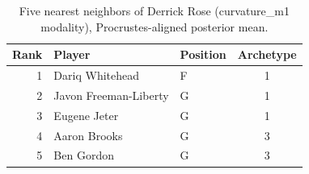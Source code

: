 \begin{table}[htbp]
  \centering\small
  \begin{tabular}{rllc}
    \toprule
    Rank & Player & Position & Archetype \\
    \midrule
    1 & Dariq Whitehead & F & 1 \\
    2 & Javon Freeman-Liberty & G & 1 \\
    3 & Eugene Jeter & G & 1 \\
    4 & Aaron Brooks & G & 3 \\
    5 & Ben Gordon & G & 3 \\
    \bottomrule
  \end{tabular}
  \caption{Five nearest neighbors of Derrick Rose (curvature_m1 modality), Procrustes-aligned posterior mean.}
  \label{tab:Derrick_Rose_neighbors_curvature_m1}
\end{table}

